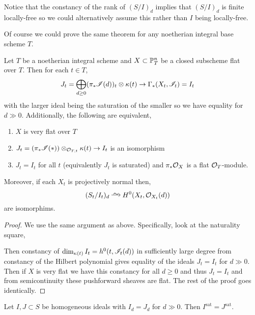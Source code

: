 \documentclass[12pt]{article}
\begin{document}
\begin{rmk}
Notice that the constancy of the rank of $(S/I)_d$ implies that $(S/I)_d$ is finite locally-free so we could alternatively assume this rather than $I$ being locally-free.
\end{rmk}
\noindent
Of course we could prove the same theorem for any noetherian integral base scheme $T$.

\begin{prop}
Let $T$ be a noetherian integral scheme and $X \subset \P^n_T$ be a closed subscheme flat over $T$. Then for each $t \in T$,
\[ J_t = \bigoplus_{d \ge 0} (\pi_* \I(d))_t \ot \kappa(t) \to \Gamma_*(X_t, \I_t) = I_t \]
with the larger ideal being the saturation of the smaller so we have equality for $d \gg 0$. Additionally, the following are equivalent,
\begin{enumerate}
\item $X$ is very flat over $T$
\item $J_t = (\pi_* \I(*)) \ot_{\stalk{T}{t}} \kappa(t) \to I_t$ is an isomorphism 
\item $J_t = I_t$ for all $t$ (equivalently $J_t$ is saturated) and $\pi_* \struct{X}$ is a flat $\struct{T}$-module.
\end{enumerate}
Moreover, if each $X_t$ is projectively normal then,
\[ (S_t/I_t)_d \iso H^0(X_t, \struct{X_t}(d)) \]
are isomorphims. 
\end{prop}

\begin{proof}
We use the same argument as above. Specifically, look at the naturality square,
\begin{center}
\end{center}
Then constancy of $\dim_{\kappa(t)} I_t = h^0(t, \I_t(d))$ in sufficiently large degree from constancy of the Hilbert polynomial gives equality of the ideals $J_t = I_t$ for $d \gg 0$. Then if $X$ is very flat we have this constancy for all $d \ge 0$ and thus $J_t = I_t$ and from semicontinuity these pushforward sheaves are flat. The rest of the proof goes identically.
\end{proof}

\begin{lemma}
Let $I,J \subset S$ be homogeneous ideals with $I_d = J_d$ for $d \gg 0$. Then $I^{\text{sat}} = J^{\text{sat}}$.
\end{lemma}
\end{document}
